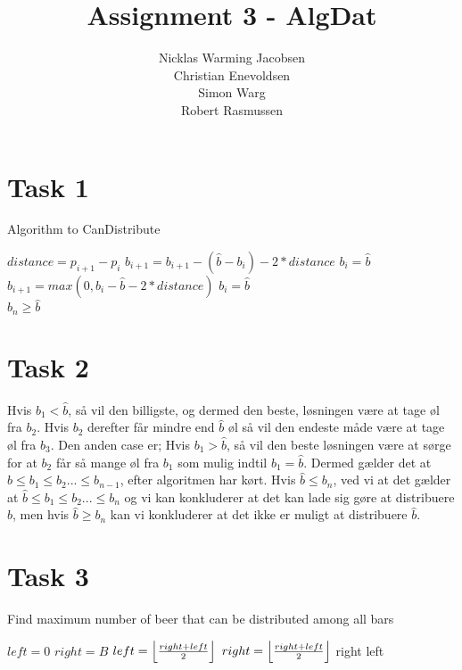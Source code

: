 \documentclass[12pt]{article}
\title{Assignment 3 - AlgDat}
\author{Nicklas Warming Jacobsen \\Christian Enevoldsen\\Simon Warg \\Robert Rasmussen}
\DeclarePairedDelimiter\floor{\lfloor}{\rfloor}
\begin{document}
\maketitle

\section*{Task 1}
\begin{algorithm}
 \caption{Algorithm to CanDistribute}

 \begin{algorithmic}
        \State $distance = p_{i+1}-p_i$
                \State $b_{i+1} = b_{i+1}- (\hat{b}-b_i) - 2*distance$
                \State $b_i = \hat{b}$
        \EndIf
                \State $b_{i+1} = max(0, b_i - \hat{b} - 2*distance)$
                \State $b_i = \hat{b}$
        \EndIf
   \EndFor \\
\Return $b_n \geq \hat{b}$
\end{algorithmic}
\end{algorithm}

\section*{Task 2}
Hvis $b_1 < \hat{b}$, så vil den billigste, og dermed den beste, løsningen være at tage øl fra $b_2$. Hvis $b_2$ derefter får mindre end $\hat{b}$ øl så vil den endeste måde være at tage øl fra $b_3$. Den anden case er; Hvis $b_1 > \hat{b}$, så vil den beste løsningen være at sørge for at $b_2$ får så mange øl fra $b_1$ som mulig indtil $b_1 = \hat{b}$.
Dermed gælder det at $\hat{b} \leq b_1 \leq b_2 ... \leq b_{n-1}$, efter algoritmen har kørt. Hvis $\hat{b} \leq b_n$, ved vi at det gælder at $\hat{b} \leq b_1 \leq b_2 ... \leq b_{n}$ og vi kan konkluderer at det kan lade sig gøre at distribuere $\hat{b}$, men hvis $\hat{b} \geq b_n$ kan vi konkluderer at det ikke er muligt at distribuere $\hat{b}$.
\section*{Task 3}
\begin{algorithm}
 \caption{Find maximum number of beer that can be distributed among all bars}

 \begin{algorithmic}
        \State $left = 0$
        \State $right = B$
                \State $left = \floor*{\frac{right+left}{2}}$
        \Else
                \State $right = \floor*{\frac{right+left}{2}}$
        \EndIf
\EndWhile
{}
        \State \Return right
\Else
        \State \Return left
\EndIf

\end{algorithmic}
\end{algorithm}
\end{document}

